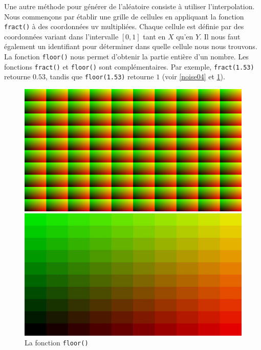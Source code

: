 Une autre méthode pour générer de l'aléatoire consiste à utiliser l'interpolation. Nous commençons par établir une grille de cellules en appliquant la fonction \lstinline{fract()} à des coordonnées uv multipliées. Chaque cellule est définie par des coordonnées variant dans l'intervalle $[0,1]$ tant en $X$ qu'en $Y$. Il nous faut également un identifiant pour déterminer dans quelle cellule nous nous trouvons. La fonction \lstinline{floor()} nous permet d'obtenir la partie entière d'un nombre. Les fonctions \lstinline{fract()} et \lstinline{floor()} sont complémentaires. Par exemple, \mbox{\lstinline{fract(1.53)}} retourne $0.53$, tandis que \lstinline{floor(1.53)} retourne $1$ (voir \ref{noise04} et \ref{noise05}).

\begin{figure}[h]
  \begin{minipage}[b]{0.45\linewidth}
    \centering
    \includegraphics[width=\linewidth]{images/noise/noise04.JPG}
    \caption{La fonction \lstinline{fract()}}
    \label{noise04}
  \end{minipage}
  \hspace{0.1\linewidth} %
  \begin{minipage}[b]{0.45\linewidth}
    \centering
    \includegraphics[width=\linewidth]{images/noise/noise05.JPG}
    \caption{La fonction \lstinline{floor()}}
    \label{noise05}
  \end{minipage}
\end{figure}

